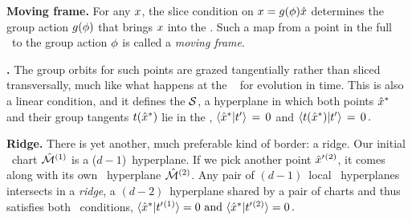 \documentclass[aip,cha,reprint,
secnumarabic,
nofootinbib, tightenlines,
nobibnotes, showkeys, showpacs,
]{revtex4-1}
\begin{document}
\textbf{Moving frame.}
For any $x$, the slice condition   on $x =
g({\bf \phi})\hat{x}$ determines the group action $g({\bf \phi})$ that
brings $ x$ into the \slice.
Such a map from a point in the full \statesp\ to the group action
${\bf \phi}$ is called a \emph{moving
frame}.

\textbf{\ChartBord.}
The
group orbits for such points are grazed tangentially rather than sliced
transversally, much like what happens at the \poincBord\
 for evolution in time. This is also a linear
condition, and it defines the {\sliceBord} ${\cal S}$, a hyperplane in
which both points $\hat{x}^\ast$ and their group tangents
$t(\hat{x}^\ast)$ lie in the {\slice},
$
\braket{\sspRSing}{\sliceTan{}} \,=\, 0 $
and
$ \braket{\groupTan(\sspRSing)}{\sliceTan{}} \,=\, 0 \,.$

\textbf{Ridge.}
There is yet another, much preferable kind of border: a ridge.
Our initial \slice\ chart $\hat{\cal M}{}^{(1)}$ is a ($d\!-\!1$)\dmn\
hyperplane. If we pick another {\template} point ${\hat{x}'}{}^{(2)}$, it
comes along with its own \slice\ hyperplane $\hat{\cal M}{}^{(2)}$. Any pair of
$(d\!-\!1)$\dmn\ local \slice\ hyperplanes intersects in a \emph{ridge},
a $(d\!-\!2)$\dmn\ hyperplane {\PoincS}
shared by a pair of charts and thus satisfies both \slice\ conditions,
\(
\braket{\sspRed^*}{\sliceTan{}{}^{(1)}} = 0
\mbox{ and }
\braket{\sspRed^*}{\sliceTan{}{}^{(2)}} = 0
    \,.
\) %
\end{document}
